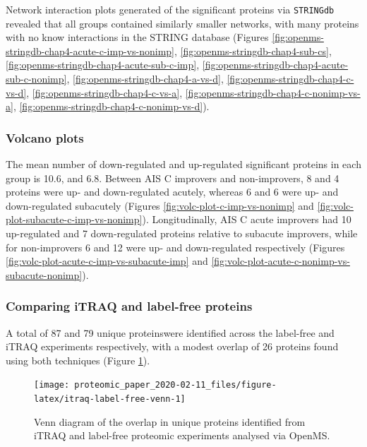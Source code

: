 \documentclass[9pt,lineno]{elife}
\begin{document}
Network interaction plots generated of the significant proteins via \texttt{STRINGdb} revealed that all groups contained similarly smaller networks, with many proteins with no know interactions in the STRING database (Figures \ref{fig:openms-stringdb-chap4-acute-c-imp-vs-nonimp}, \ref{fig:openms-stringdb-chap4-sub-cs}, \ref{fig:openms-stringdb-chap4-acute-sub-c-imp}, \ref{fig:openms-stringdb-chap4-acute-sub-c-nonimp}, \ref{fig:openms-stringdb-chap4-a-vs-d}, \ref{fig:openms-stringdb-chap4-c-vs-d}, \ref{fig:openms-stringdb-chap4-c-vs-a}, \ref{fig:openms-stringdb-chap4-c-nonimp-vs-a}, \ref{fig:openms-stringdb-chap4-c-nonimp-vs-d}).

\hypertarget{volcano-plots}{%
\subsubsection{Volcano plots}\label{volcano-plots}}

The mean number of down-regulated and up-regulated significant proteins in each group is 10.6, and 6.8.
Between AIS C improvers and non-improvers, 8 and 4 proteins were up- and down-regulated acutely, whereas 6 and 6 were up- and down-regulated subacutely (Figures \ref{fig:volc-plot-c-imp-vs-nonimp} and \ref{fig:volc-plot-subacute-c-imp-vs-nonimp}).
Longitudinally, AIS C acute improvers had 10 up-regulated and 7 down-regulated proteins relative to subacute improvers, while for non-improvers 6 and 12 were up- and down-regulated respectively (Figures \ref{fig:volc-plot-acute-c-imp-vs-subacute-imp} and \ref{fig:volc-plot-acute-c-nonimp-vs-subacute-nonimp}).

\hypertarget{comparing-itraq-and-label-free-proteins}{%
\subsubsection{Comparing iTRAQ and label-free proteins}\label{comparing-itraq-and-label-free-proteins}}

A total of 87 and 79 unique proteinswere identified across the label-free and iTRAQ experiments respectively, with a modest overlap of 26 proteins found using both techniques (Figure \ref{fig:itraq-label-free-venn}).



\begin{figure}

{\centering \texttt{[image: proteomic\_paper\_2020-02-11\_files/figure-latex/itraq-label-free-venn-1]} 

}

\caption{Venn diagram of the overlap in unique proteins identified from iTRAQ and label-free proteomic experiments analysed via OpenMS.}\label{fig:itraq-label-free-venn}
\end{figure}
\end{document}
